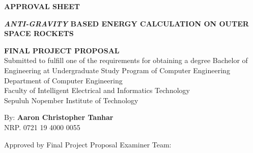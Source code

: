 \begin{center}
  \large
  \textbf{APPROVAL SHEET}
\end{center}

\thispagestyle{empty}

\begin{center}
  \textbf{\emph{ANTI-GRAVITY} BASED ENERGY CALCULATION ON OUTER SPACE ROCKETS}
\end{center}

\begingroup
\small

\begin{center}
  \textbf{FINAL PROJECT PROPOSAL} \\
  Submitted to fulfill one of the requirements for obtaining a degree
  Bachelor of Engineering at
  Undergraduate Study Program of Computer Engineering \\
  Department of Computer Engineering \\
  Faculty of Intelligent Electrical and Informatics Technology \\
  Sepuluh Nopember Institute of Technology
\end{center}

\begin{center}
  By: \textbf{Aaron Christopher Tanhar} \\
  NRP. 0721 19 4000 0055
\end{center}

\begin{center}
  Approved by Final Project Proposal Examiner Team:
\end{center}

\begingroup
\setlength{\tabcolsep}{0pt}

